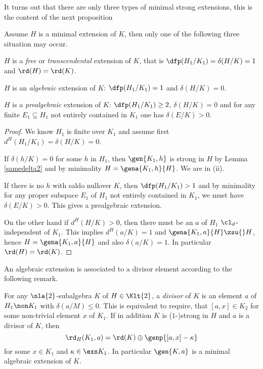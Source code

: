 It turns out that there are only three
types of minimal strong extensions, this is the content of the next proposition
\begin{prop}
Assume $H$ is a minimal extension of $K$, then only one of the following
three situation may occur.
\begin{itemize}
 $H$ is a {\em free} or {\em transcendental} extension of $K$, that is $\dfp(H_{1}/K_{1})=\delta(H/K)=1$ and $\rd(H)=\rd(K)$.

 $H$ is an {\em algebraic} extension of $K$: $\dfp(H_{1}/K_{1})=1$ and $\delta(H/K)=0$.

 $H$ is a {\em prealgebraic} extension of $K$: $\dfp(H_{1}/K_{1})\geq2$, $\delta(H/K)=0$ and
for any finite $E_{1}\subsetneq H_{1}$ not entirely contained in $K_{1}$ one has $\delta(E/K)>0$. 
\end{itemize}
\end{prop}
\begin{proof}
We know $H_{1}$ is finite over $K_{1}$ and assume first
$d^{H}(H_{1}/K_{1})=\delta(H/K)=0$.

If $\delta(h/K)=0$ for some $h$ in $H_{1}$,
then $\gen{K_{1},h}$ is strong in $H$ by Lemma \ref{samedelta2} and by minimality $H=\gena{K_{1},h}{H}$. We are in (ii).

\smallskip
If there is no $h$ with \lqq saldo null\rqq over $K$, then $\dfp(H_{1}/K_{1})>1$ and by minimality
for any proper subspace $E_{1}$ of $H_{1}$ not entirely contained in $K_{1}$, we must have $\delta(E/K)>0$.
This gives a prealgebraic extension.

\medskip
On the other hand if $d^{H}(H/K)>0$, then there must be an $a$ of $H_{1}$ $\cl_{d}$-independent of
$K_{1}$. This implies $d^{H}(a/K)=1$ and $\gena{K_{1},a}{H}\zsu{}H$, hence $H=\gena{K_{1},a}{H}$ and
also $\delta(a/K)=1$. In particular $\rd(H)=\rd(K)$.
\end{proof}

An algebraic extension is associated to a divisor element according to the following remark.
\begin{rem}\label{divelement}
For any $\nla{2}$-subalgebra $K$ of $H\in\Klt{2}$, a {\em divisor} of $K$ is an element $a$ of $H_{1}\non K_{1}$
with $\delta(a/M)\leq0$. This is equivalent to require, that $[a,x]\in K_{2}$ for some non-trivial element $x$ of $K_{1}$.
If in addition $K$ is ($1$-)strong in $H$ and $a$ is a divisor of $K$, then $$\rd_{H}(K_{1},a)=\rd(K)\oplus\genp{[a,x]-\kappa}$$
for some $x\in K_{1}$ and $\kappa\in\exs K_{1}$. In particular $\gen{K,a}$ is a minimal algebraic extension of $K$.
\end{rem}

